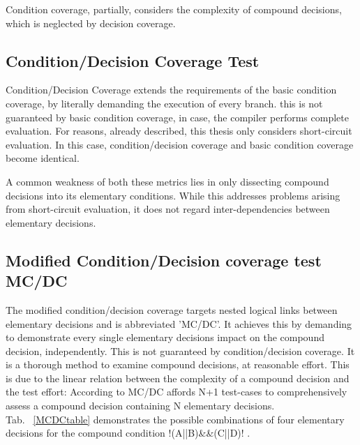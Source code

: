 	
	Condition coverage, partially, considers the complexity of compound decisions, which is neglected by decision coverage.
	
	\subsection{Condition/Decision Coverage Test}
	Condition/Decision Coverage extends the requirements of the basic condition coverage, by literally demanding the execution of every branch.  this is not guaranteed by basic condition coverage, in case, the compiler performs complete evaluation. For reasons, already described, this thesis only considers short-circuit evaluation. In this case, condition/decision coverage and basic condition coverage become identical.

	A common weakness of both these metrics lies in only dissecting compound decisions into its elementary conditions. While this addresses problems arising from short-circuit evaluation, it does not regard inter-dependencies between elementary decisions.
	
	\subsection{Modified Condition/Decision coverage test MC/DC}
	The modified condition/decision coverage targets nested logical links between elementary decisions and is abbreviated 'MC/DC'. It achieves this by demanding to demonstrate every single elementary decisions impact on the compound decision, independently. This is not guaranteed by condition/decision coverage. It is a thorough method to examine compound decisions, at reasonable effort. This is due to the linear relation between the complexity of a compound decision and the test effort: According to \cite{ChilenskiMiller1994} MC/DC affords N+1 test-cases to comprehensively assess a compound decision containing N elementary decisions. \\

	Tab. ~\ref{MCDCtable} demonstrates the possible combinations of four elementary decisions for the compound condition \lstC !(A||B)\&\&(C||D)! .


